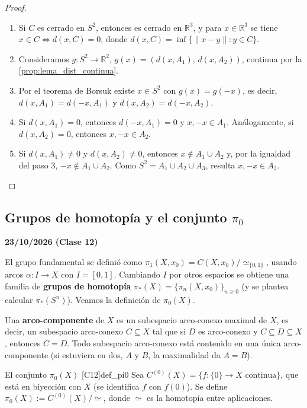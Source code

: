 \begin{proof}
\begin{enumerate}
    \item Si $C$ es cerrado en $S^2$, entonces es cerrado en $\mathbb{R}^3$, y para $x \in \mathbb{R}^3$ se tiene $x \in C \iff d(x,C) = 0$, donde $d(x,C) = \inf\{\|x - y\| : y \in C\}$.
    \item Consideramos $g \colon S^2 \to \mathbb{R}^2$, $g(x) = (d(x,A_1),\, d(x,A_2))$, continua por la \cref{prop:lema_dist_continua}.
    \item Por el teorema de Borsuk existe $x \in S^2$ con $g(x) = g(-x)$, es decir, $d(x,A_1) = d(-x,A_1)$ y $d(x,A_2) = d(-x,A_2)$.
    \item Si $d(x,A_1) = 0$, entonces $d(-x,A_1) = 0$ y $x, -x \in A_1$. Análogamente, si $d(x,A_2) = 0$, entonces $x, -x \in A_2$.
    \item Si $d(x,A_1) \neq 0$ y $d(x,A_2) \neq 0$, entonces $x \notin A_1 \cup A_2$ y, por la igualdad del paso 3, $-x \notin A_1 \cup A_2$. Como $S^2 = A_1 \cup A_2 \cup A_3$, resulta $x, -x \in A_3$.
\end{enumerate}
\end{proof}

\subsection{Grupos de homotopía y el conjunto $\pi_0$}

\textbf{23/10/2026 (Clase 12)}

El grupo fundamental se definió como $\pi_1(X,x_0) = C(X,x_0)/\simeq_{\{0,1\}}$, usando arcos $\alpha \colon I \to X$ con $I = [0,1]$. Cambiando $I$ por otros espacios se obtiene una familia de \textbf{grupos de homotopía} $\pi_*(X) = \{\pi_n(X,x_0)\}_{n \geq 0}$ (y se plantea calcular $\pi_*(S^n)$). Veamos la definición de $\pi_0(X)$.

Una \textbf{arco-componente} de $X$ es un subespacio arco-conexo maximal de $X$, es decir, un subespacio arco-conexo $C \subseteq X$ tal que si $D$ es arco-conexo y $C \subseteq D \subseteq X$, entonces $C = D$. Todo subespacio arco-conexo está contenido en una única arco-componente (si estuviera en dos, $A$ y $B$, la maximalidad da $A = B$).

\begin{definicion}{El conjunto $\pi_0(X)$ [C12]}{def_pi0}
Sea $C^{(0)}(X) = \{f \colon \{0\} \to X \text{ continua}\}$, que está en biyección con $X$ (se identifica $f$ con $f(0)$). Se define $\pi_0(X) := C^{(0)}(X)/\!\simeq$, donde $\simeq$ es la homotopía entre aplicaciones.
\end{definicion}

